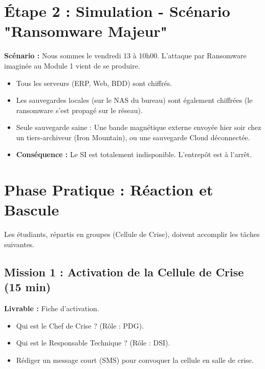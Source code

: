 \section{Étape 2 : Simulation - Scénario "Ransomware Majeur"}

\begin{boxlizbiz}
\textbf{Scénario :}
Nous sommes le vendredi 13 à 10h00. L'attaque par Ransomware imaginée au Module 1 vient de se produire.
\begin{itemize}
    \item Tous les serveurs (ERP, Web, BDD) sont chiffrés.
    \item Les sauvegardes locales (sur le NAS du bureau) sont également chiffrées (le ransomware s'est propagé sur le réseau).
    \item Seule sauvegarde saine : Une bande magnétique externe envoyée hier soir chez un tiers-archiveur (Iron Mountain), ou une sauvegarde Cloud déconnectée.
    \item \textbf{Conséquence :} Le SI est totalement indisponible. L'entrepôt est à l'arrêt.
\end{itemize}
\end{boxlizbiz}

\section{Phase Pratique : Réaction et Bascule}

Les étudiants, répartis en groupes (Cellule de Crise), doivent accomplir les tâches suivantes.

\subsection{Mission 1 : Activation de la Cellule de Crise (15 min)}

\textbf{Livrable :} Fiche d'activation.
\begin{itemize}
    \item Qui est le Chef de Crise ? (Rôle : PDG).
    \item Qui est le Responsable Technique ? (Rôle : DSI).
    \item Rédiger un message court (SMS) pour convoquer la cellule en salle de crise.
\end{itemize}

